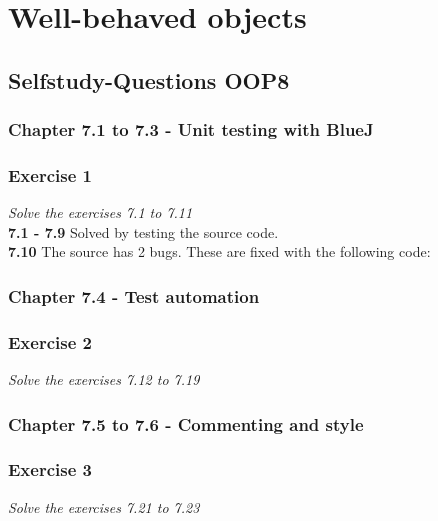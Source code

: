 \section{Well-behaved objects}


\subsection{Selfstudy-Questions OOP8}

\subsubsection{Chapter 7.1 to 7.3 - Unit testing with BlueJ}

\subsubsection*{Exercise 1}
\textit{Solve the exercises 7.1 to 7.11} \\

\textbf{7.1 - 7.9} Solved by testing the source code. \\

\textbf{7.10} The source has 2 bugs. These are fixed with the following code:





\subsubsection{Chapter 7.4 - Test automation}

\subsubsection*{Exercise 2}
\textit{Solve the exercises 7.12 to 7.19} \\

\subsubsection{Chapter 7.5 to 7.6 - Commenting and style}

\subsubsection*{Exercise 3}
\textit{Solve the exercises 7.21 to 7.23} \\

